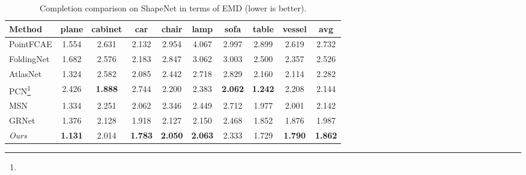 \documentclass[final]{cvpr}
\begin{document}
\begin{table}
\begin{center}
\footnotesize
\setlength\tabcolsep{1.5pt}
\begin{tabular}{@{}l|cccccccc|c@{}}
\toprule
Method&plane&cabinet&car&chair&lamp&sofa&table&vessel&avg\\
\midrule
PointFCAE & 1.554 & 2.631 & 2.132 & 2.954 & 4.067 & 2.997 & 2.899 & 2.619 & 2.732\\
FoldingNet & 1.682 & 2.576 & 2.183 & 2.847 & 3.062 & 3.003 & 2.500 & 2.357 & 2.526 \\
AtlasNet & 1.324 & 2.582 & 2.085 & 2.442 & 2.718 & 2.829 & 2.160 & 2.114 & 2.282 \\
PCN\footnote{} & 2.426 & \textbf{1.888} & 2.744 & 2.200 & 2.383 & \textbf{2.062} & \textbf{1.242} & 2.208 & 2.144 \\
MSN & 1.334 & 2.251 & 2.062 & 2.346 & 2.449 & 2.712 & 1.977 & 2.001 & 2.142 \\
GRNet & 1.376 & 2.128 & 1.918 & 2.127 & 2.150 & 2.468 & 1.852 & 1.876 & 1.987 \\
\emph{Ours} & \textbf{1.131} & 2.014 & \textbf{1.783} & \textbf{2.050} & \textbf{2.063} & 2.333 & 1.729 & \textbf{1.790} & \textbf{1.862}\\
\bottomrule
\end{tabular}
\end{center}
\caption{Completion comparison on ShapeNet in terms of EMD  (lower is better).}
\label{table:shapenet_emd}
\end{table}

\end{document}
